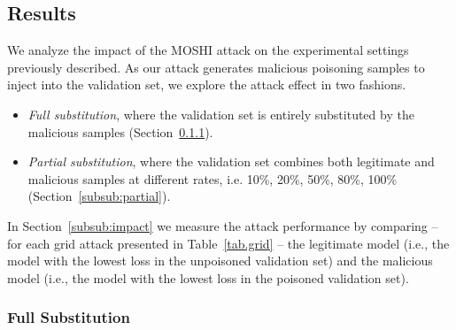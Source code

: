 \subsection{Results}
\label{subsec:results}

We analyze the impact of the MOSHI attack on the experimental settings previously described.
As our attack generates malicious poisoning samples to inject into the validation set, we explore the attack effect in two fashions.
\begin{itemize}
    \item \textit{Full substitution}, where the validation set is entirely substituted by the malicious samples (Section~\ref{subsub:full}). 
    \item \textit{Partial substitution}, where the validation set combines both legitimate and malicious samples at different rates, i.e. 10\%, 20\%, 50\%, 80\%, 100\% (Section~\ref{subsub:partial}). 
\end{itemize}
In Section~\ref{subsub:impact} we measure the attack performance by comparing -- for each grid attack presented in Table~\ref{tab.grid} -- the legitimate model (i.e., the model with the lowest loss in the unpoisoned validation set) and the malicious model (i.e., the model with the lowest loss in the poisoned validation set). 

\subsubsection{Full Substitution}
\label{subsub:full}

